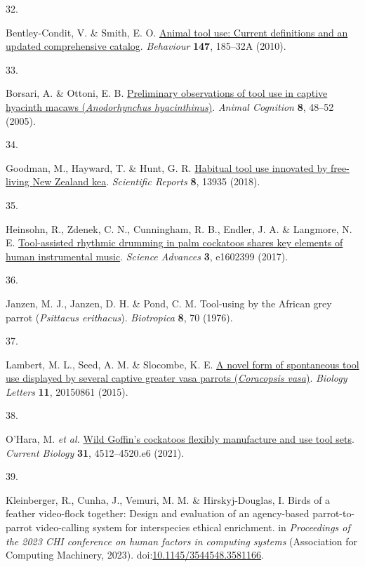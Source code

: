 \documentclass[
  man,floatsintext]{apa6}
\newlength{\cslhangindent}
\newlength{\csllabelwidth}
\newlength{\cslentryspacingunit} %
\newenvironment{CSLReferences}[2] %
 {%
  \setlength{\parindent}{0pt}
  \ifodd #1
  \let\oldpar\par
  \def\par{\hangindent=\cslhangindent\oldpar}
  \fi
  \setlength{\parskip}{#2\cslentryspacingunit}
 }%
 {}
\newcommand{\CSLLeftMargin}[1]{\parbox[t]{\csllabelwidth}{#1}}
\newcommand{\CSLRightInline}[1]{\parbox[t]{\linewidth - \csllabelwidth}{#1}\break}
\begin{document}
\begin{CSLReferences}{0}{0}
\leavevmode{}%
\CSLLeftMargin{32. }%
\CSLRightInline{Bentley-Condit, V. \& Smith, E. O. \href{https://doi.org/10.1163/000579509X12512865686555}{Animal tool use: Current definitions and an updated comprehensive catalog}. \emph{Behaviour} \textbf{147}, 185--32A (2010).}

\leavevmode{}%
\CSLLeftMargin{33. }%
\CSLRightInline{Borsari, A. \& Ottoni, E. B. \href{https://doi.org/10.1007/s10071-004-0221-3}{Preliminary observations of tool use in captive hyacinth macaws (\emph{{A}nodorhynchus hyacinthinus})}. \emph{Animal Cognition} \textbf{8}, 48--52 (2005).}

\leavevmode{}%
\CSLLeftMargin{34. }%
\CSLRightInline{Goodman, M., Hayward, T. \& Hunt, G. R. \href{https://doi.org/10.1038/s41598-018-32363-9}{Habitual tool use innovated by free-living {N}ew {Z}ealand kea}. \emph{Scientific Reports} \textbf{8}, 13935 (2018).}

\leavevmode{}%
\CSLLeftMargin{35. }%
\CSLRightInline{Heinsohn, R., Zdenek, C. N., Cunningham, R. B., Endler, J. A. \& Langmore, N. E. \href{https://doi.org/10.1126/sciadv.1602399}{Tool-assisted rhythmic drumming in palm cockatoos shares key elements of human instrumental music}. \emph{Science Advances} \textbf{3}, e1602399 (2017).}

\leavevmode{}%
\CSLLeftMargin{36. }%
\CSLRightInline{Janzen, M. J., Janzen, D. H. \& Pond, C. M. Tool-using by the {A}frican grey parrot (\emph{{P}sittacus erithacus}). \emph{Biotropica} \textbf{8}, 70 (1976).}

\leavevmode{}%
\CSLLeftMargin{37. }%
\CSLRightInline{Lambert, M. L., Seed, A. M. \& Slocombe, K. E. \href{https://doi.org/10.1098/rsbl.2015.0861}{A novel form of spontaneous tool use displayed by several captive greater vasa parrots (\emph{{C}oracopsis vasa})}. \emph{Biology Letters} \textbf{11}, 20150861 (2015).}

\leavevmode{}%
\CSLLeftMargin{38. }%
\CSLRightInline{O'Hara, M. \emph{et al.} \href{https://doi.org/10.1016/j.cub.2021.08.009}{Wild {G}offin's cockatoos flexibly manufacture and use tool sets}. \emph{Current Biology} \textbf{31}, 4512--4520.e6 (2021).}

\leavevmode{}%
\CSLLeftMargin{39. }%
\CSLRightInline{Kleinberger, R., Cunha, J., Vemuri, M. M. \& Hirskyj-Douglas, I. Birds of a feather video-flock together: Design and evaluation of an agency-based parrot-to-parrot video-calling system for interspecies ethical enrichment. in \emph{Proceedings of the 2023 CHI conference on human factors in computing systems} (Association for Computing Machinery, 2023). doi:\href{https://doi.org/10.1145/3544548.3581166}{10.1145/3544548.3581166}.}


\end{CSLReferences}
\end{document}
